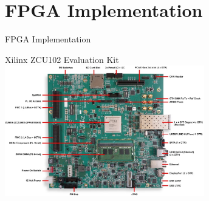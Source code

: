 \setlength{\parskip}{\baselineskip}
\section{FPGA Implementation}

\begin{frame}
    \huge FPGA Implementation
\end{frame}


\begin{frame}{Xilinx ZCU102 Evaluation Kit}
	\centering
	\includegraphics[width=0.65\textwidth]{../Images/Hardware/ZCU102-board-overview.jpg}\\
\end{frame}

